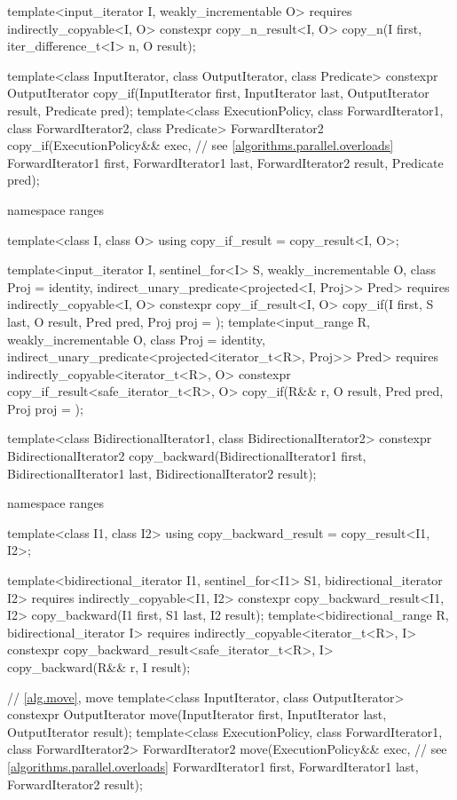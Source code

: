 \begin{codeblock}
{{    template<input_iterator I, weakly_incrementable O>
      requires indirectly_copyable<I, O>
      constexpr copy_n_result<I, O>
        copy_n(I first, iter_difference_t<I> n, O result);
  }

  template<class InputIterator, class OutputIterator, class Predicate>
    constexpr OutputIterator copy_if(InputIterator first, InputIterator last,
                                     OutputIterator result, Predicate pred);
  template<class ExecutionPolicy, class ForwardIterator1, class ForwardIterator2,
           class Predicate>
    ForwardIterator2 copy_if(ExecutionPolicy&& exec,            // see \ref{algorithms.parallel.overloads}
                             ForwardIterator1 first, ForwardIterator1 last,
                             ForwardIterator2 result, Predicate pred);

  namespace ranges {
    template<class I, class O>
    using copy_if_result = copy_result<I, O>;

    template<input_iterator I, sentinel_for<I> S, weakly_incrementable O, class Proj = identity,
             indirect_unary_predicate<projected<I, Proj>> Pred>
      requires indirectly_copyable<I, O>
      constexpr copy_if_result<I, O>
        copy_if(I first, S last, O result, Pred pred, Proj proj = {});
    template<input_range R, weakly_incrementable O, class Proj = identity,
             indirect_unary_predicate<projected<iterator_t<R>, Proj>> Pred>
      requires indirectly_copyable<iterator_t<R>, O>
      constexpr copy_if_result<safe_iterator_t<R>, O>
        copy_if(R&& r, O result, Pred pred, Proj proj = {});
  }

  template<class BidirectionalIterator1, class BidirectionalIterator2>
    constexpr BidirectionalIterator2
      copy_backward(BidirectionalIterator1 first, BidirectionalIterator1 last,
                    BidirectionalIterator2 result);

  namespace ranges {
    template<class I1, class I2>
    using copy_backward_result = copy_result<I1, I2>;

    template<bidirectional_iterator I1, sentinel_for<I1> S1, bidirectional_iterator I2>
      requires indirectly_copyable<I1, I2>
      constexpr copy_backward_result<I1, I2>
        copy_backward(I1 first, S1 last, I2 result);
    template<bidirectional_range R, bidirectional_iterator I>
      requires indirectly_copyable<iterator_t<R>, I>
      constexpr copy_backward_result<safe_iterator_t<R>, I>
        copy_backward(R&& r, I result);
  }

  // \ref{alg.move}, move
  template<class InputIterator, class OutputIterator>
    constexpr OutputIterator move(InputIterator first, InputIterator last,
                                  OutputIterator result);
  template<class ExecutionPolicy, class ForwardIterator1,
           class ForwardIterator2>
    ForwardIterator2 move(ExecutionPolicy&& exec,               // see \ref{algorithms.parallel.overloads}
                          ForwardIterator1 first, ForwardIterator1 last,
                          ForwardIterator2 result);

}
\end{codeblock}
